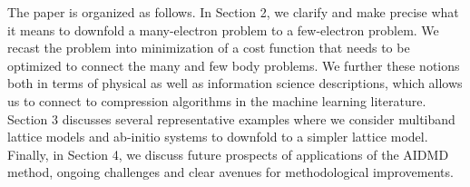 
The paper is organized as follows. In Section 2, we clarify and make precise what it means to downfold 
a many-electron problem to a few-electron problem. We recast the problem into minimization 
of a cost function that needs to be optimized to connect the many and few body problems. We further 
these notions both in terms of physical as well as information science descriptions, which allows us to connect to 
compression algorithms in the machine learning literature. 
Section 3 discusses several representative examples where we consider multiband lattice models 
and ab-initio systems to downfold to a simpler lattice model. 
Finally, in Section 4, we discuss future prospects of applications of the AIDMD method, ongoing challenges 
and clear avenues for methodological improvements. 



